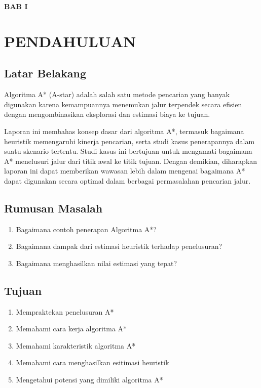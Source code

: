 \documentclass[12pt,a4paper]{article}
\begin{document}
\newpage


\begin{center}
  \large{\textbf{BAB I}}

  \section*{PENDAHULUAN}
\end{center}
\vspace{1cm}

\subsection{Latar Belakang}
Algoritma A* (A-star) adalah salah satu metode pencarian yang banyak
digunakan karena kemampuannya menemukan jalur terpendek secara efisien
dengan mengombinasikan eksplorasi dan estimasi biaya ke tujuan.

Laporan ini membahas konsep dasar dari algoritma A*, termasuk bagaimana
heuristik memengaruhi kinerja pencarian, serta studi kasus penerapannya
dalam suatu skenario tertentu. Studi kasus ini bertujuan untuk mengamati
bagaimana A* menelusuri jalur dari titik awal ke titik tujuan.
Dengan demikian, diharapkan laporan ini dapat memberikan wawasan
lebih dalam mengenai bagaimana A* dapat digunakan secara optimal
dalam berbagai permasalahan pencarian jalur.


\subsection{Rumusan Masalah}

\begin{enumerate}
  \item Bagaimana contoh penerapan Algoritma A*?
  \item Bagaimana dampak dari estimasi heuristik terhadap penelusuran?
  \item Bagaimana menghasilkan nilai estimasi yang tepat?
\end{enumerate}


\subsection{Tujuan}

\begin{enumerate}
\item Mempraktekan penelusuran A*
\item Memahami cara kerja algoritma A*
\item Memahami karakteristik algoritma A*
\item Memahami cara menghasilkan esitimasi heuristik
\item Mengetahui potensi yang dimiliki algoritma A*
\end{enumerate}
\end{document}
